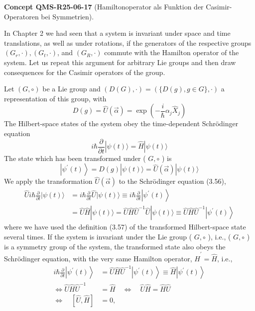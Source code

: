 \documentclass[10pt, letterpaper]{article}
\newcommand{\CustomHeading}[3]{%
  \par\medskip\noindent%
  \textbf{#1 #2} \textnormal{(#3)}.\enskip%
}
\newenvironment{CONC}[2]{\begin{unitbox}\CustomHeading{Concept}{#1}{#2}}{\end{unitbox}}
\begin{document}
\begin{CONC}{QMS-R25-06-17}{Hamiltonoperator als Funktion der Casimir-Operatoren bei Symmetrien}
In Chapter 2 we had seen that a system is invariant under space and time translations, as well as under rotations, if the generators of the respective groups $\left(G_{r}, \cdot\right),\left(G_{t}, \cdot\right)$, and $\left(G_{R}, \cdot\right)$ commute with the Hamilton operator of the system. Let us repeat this argument for arbitrary Lie groups and then draw consequences for the Casimir operators of the group.

Let $(G, \circ)$ be a Lie group and $(D(G), \cdot)=(\{D(g), g \in G\}, \cdot)$ a representation of this group, with
$$
D(g)=\hat{U}(\vec{\alpha})=\exp \left(-\frac{i}{\hbar} \alpha_{j} \hat{X}_{j}\right)
$$
The Hilbert-space states of the system obey the time-dependent Schrödinger equation
$$
i \hbar \frac{\partial}{\partial t}|\psi(t)\rangle=\hat{H}|\psi(t)\rangle
$$
The state which has been transformed under ( $G, \circ$ ) is
$$
\left|\psi^{\prime}(t)\right\rangle=D(g)|\psi(t)\rangle=\hat{U}(\vec{\alpha})|\psi(t)\rangle
$$
We apply the transformation $\hat{U}(\vec{\alpha})$ to the Schrödinger equation (3.56),
$$
\begin{aligned}
\hat{U} i \hbar \frac{\partial}{\partial t}|\psi(t)\rangle & =i \hbar \frac{\partial}{\partial t} \hat{U}|\psi(t)\rangle \equiv i \hbar \frac{\partial}{\partial t}\left|\psi^{\prime}(t)\right\rangle \\
& =\hat{U} \hat{H}|\psi(t)\rangle=\hat{U} \hat{H} \hat{U}^{-1} \hat{U}|\psi(t)\rangle \equiv \hat{U} \hat{H} \hat{U}^{-1}\left|\psi^{\prime}(t)\right\rangle
\end{aligned}
$$
where we have used the definition (3.57) of the transformed Hilbert-space state several times. If the system is invariant under the Lie group ( $G, \circ$ ), i.e., ( $G, \circ$ ) is a symmetry group of the system, the transformed state also obeys the Schrödinger equation, with the very same Hamilton operator, $\hat{H}^{\prime}=\hat{H}$, i.e.,
$$
\begin{aligned}
i \hbar \frac{\partial}{\partial t}\left|\psi^{\prime}(t)\right\rangle & =\hat{U} \hat{H} \hat{U}^{-1}\left|\psi^{\prime}(t)\right\rangle \equiv \hat{H}\left|\psi^{\prime}(t)\right\rangle \\
\Longleftrightarrow \hat{U} \hat{H} \hat{U}^{-1} & =\hat{H} \quad \Longleftrightarrow \quad \hat{U} \hat{H}=\hat{H} \hat{U} \\
\Longleftrightarrow \quad[\hat{U}, \hat{H}] & =0,
\end{aligned}
$$
\end{CONC}
\end{document}
